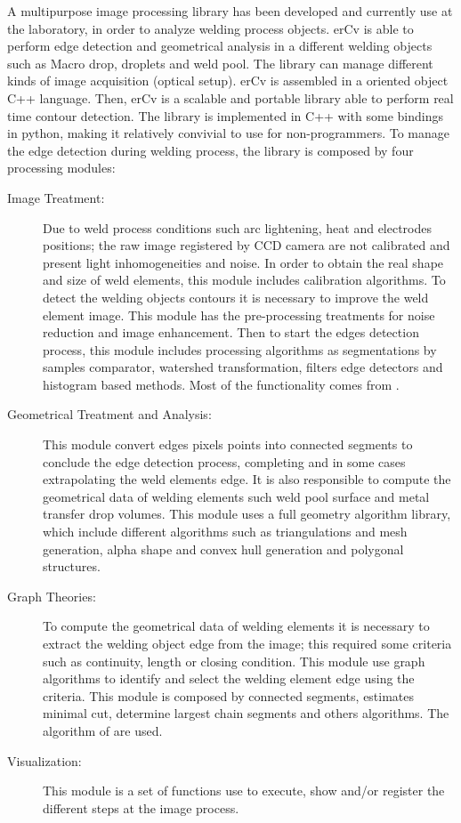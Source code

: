 \documentclass[12pt]{iopart}
\begin{document}
A multipurpose image processing library has been developed 
and currently use at the laboratory, in order to analyze welding process objects.
erCv is able to perform edge detection and geometrical analysis in a different 
welding objects such as Macro drop, droplets and weld pool.
The library can manage
different kinds of image acquisition (optical setup). 
erCv is assembled in a oriented object C++ language.
Then,  erCv is a scalable 
and portable library able to perform real time
 contour detection. The library is implemented in  C++ with some bindings in python,
 making it relatively convivial to use for non-programmers.
To manage the edge detection during welding process,
the library is composed by four processing modules: 
\begin{description}
\item[Image Treatment:] Due to weld process conditions such arc lightening, 
 heat and electrodes positions; the raw image registered by CCD 
 camera are not calibrated and present light inhomogeneities and 
 noise. In order to obtain the real shape and size of weld elements, this module 
 includes calibration algorithms. To detect the welding objects contours it is 
 necessary to improve the weld element image. This module has the 
 pre-processing treatments for noise reduction and image enhancement.
 Then to start the edges detection process, this module includes processing
 algorithms as segmentations by samples comparator, watershed transformation,
 filters edge detectors and histogram based methods.  
 Most of the functionality comes from \cite{OPENCV}.
\item[Geometrical Treatment and Analysis:] This module convert edges pixels points into connected 
   segments to conclude the edge detection
  process, completing and in some cases extrapolating the weld
  elements edge. It is also responsible to compute the geometrical 
  data of welding elements such weld pool surface and metal transfer drop volumes. 
  This module uses a full geometry algorithm library\cite{CGAL}, which include different algorithms
  such as triangulations and mesh generation, alpha shape and 
  convex hull generation and polygonal structures.
\item[Graph Theories:] To compute the geometrical data of welding elements
   it is necessary to extract the welding object edge from the image; this
   required some criteria such as continuity, length or closing condition.
   This module use graph algorithms to  identify and select the welding element edge using the
   criteria. This module is composed by connected segments, estimates
   minimal cut, determine largest chain segments and others algorithms. 
   The algorithm of \cite{BOOSTGRAPH} are used.
\item[Visualization:] This module is a set of 
  functions use to execute, show and/or register the 
  different steps at the image process.
\end{description}
\end{document}
